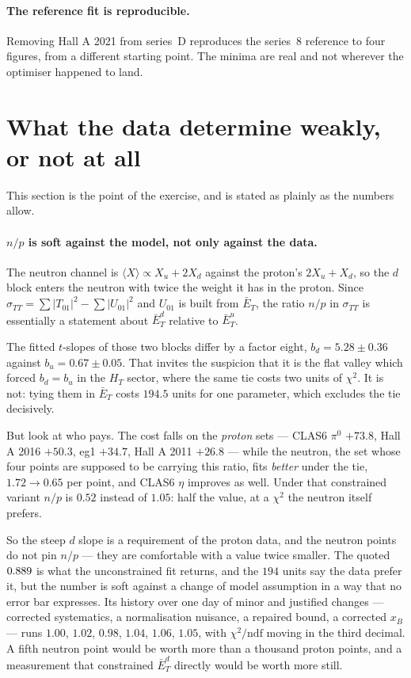 \documentclass[11pt,a4paper]{article}
\newcommand{\sig}[1]{\sigma_{#1}}
\begin{document}
\paragraph{The reference fit is reproducible.}  Removing Hall A 2021 from
series~D reproduces the series~8 reference to four figures, from a different
starting point.  The minima are real and not wherever the optimiser happened to
land.

\section{What the data determine weakly, or not at all}
\label{sec:notmeasured}

This section is the point of the exercise, and is stated as plainly as the
numbers allow.

\paragraph{$n/p$ is soft against the model, not only against the data.}
The neutron channel is $\langle X\rangle \propto X_u + 2X_d$ against the
proton's $2X_u + X_d$, so the $d$ block enters the neutron with twice the weight
it has in the proton.  Since $\sig{TT} = \sum|T_{01}|^2 - \sum|U_{01}|^2$ and
$U_{01}$ is built from $\bar E_T$, the ratio $n/p$ in $\sig{TT}$ is essentially a
statement about $\bar E_T^d$ relative to $\bar E_T^u$.

The fitted $t$-slopes of those two blocks differ by a factor eight,
$b_d = 5.28 \pm 0.36$ against $b_u = 0.67 \pm 0.05$.  That invites the suspicion
that it is the flat valley which forced $b_d = b_u$ in the $H_T$ sector, where
the same tie costs two units of $\chi^2$.  It is not: tying them in
$\bar E_T$ costs $194.5$ units for one parameter, which excludes the tie
decisively.

But look at who pays.  The cost falls on the \emph{proton} sets --- CLAS6
$\pi^0$ $+73.8$, Hall A 2016 $+50.3$, eg1 $+34.7$, Hall A 2011 $+26.8$ --- while
the neutron, the set whose four points are supposed to be carrying this ratio,
fits \emph{better} under the tie, $1.72 \to 0.65$ per point, and CLAS6 $\eta$
improves as well.  Under that constrained variant $n/p$ is $0.52$ instead of
$1.05$: half the value, at a $\chi^2$ the neutron itself prefers.

So the steep $d$ slope is a requirement of the proton data, and the neutron
points do not pin $n/p$ --- they are comfortable with a value twice smaller.
The quoted $0.889$ is what the unconstrained fit returns, and the $194$ units
say the data prefer it, but the number is soft against a change of model
assumption in a way that no error bar expresses.  Its history over one day of
minor and justified changes --- corrected systematics, a normalisation nuisance,
a repaired bound, a corrected $x_B$ --- runs $1.00$, $1.02$, $0.98$, $1.04$,
$1.06$, $1.05$, with $\chi^2/\mathrm{ndf}$ moving in the third decimal.  A fifth
neutron point would be worth more than a thousand proton points, and a
measurement that constrained $\bar E_T^d$ directly would be worth more still.
\end{document}
